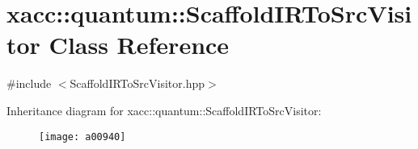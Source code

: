 \hypertarget{a00940}{}\section{xacc\+:\+:quantum\+:\+:Scaffold\+I\+R\+To\+Src\+Visitor Class Reference}
\label{a00940}


{\ttfamily \#include $<$Scaffold\+I\+R\+To\+Src\+Visitor.\+hpp$>$}

Inheritance diagram for xacc\+:\+:quantum\+:\+:Scaffold\+I\+R\+To\+Src\+Visitor\+:\begin{figure}[H]
\begin{center}
\leavevmode
\texttt{[image: a00940]}
\end{center}
\end{figure}
